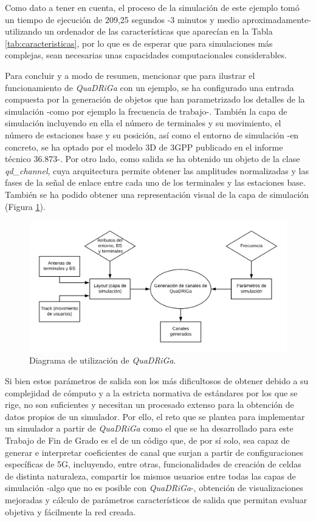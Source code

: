 Como dato a tener en cuenta, el proceso de la simulación de este ejemplo tomó un tiempo de ejecución de 209,25 segundos -3 minutos y medio aproximadamente- utilizando un ordenador de las características que aparecían en la Tabla \ref{tab:caracteristicas}, por lo que es de esperar que para simulaciones más complejas, sean necesarias unas capacidades computacionales considerables.

Para concluir y a modo de resumen, mencionar que para ilustrar el funcionamiento de \textit{QuaDRiGa} con un ejemplo, se ha configurado una entrada compuesta por la generación de objetos que han parametrizado los detalles de la simulación -como por ejemplo la frecuencia de trabajo-. También la capa de simulación incluyendo en ella el número de terminales y su movimiento, el número de estaciones base y su posición, así como el entorno de simulación -en concreto, se ha optado por el modelo 3D de 3GPP publicado en el informe técnico 36.873-. Por otro lado, como salida se ha obtenido un objeto de la clase \textit{qd\_channel}, cuya arquitectura permite obtener las amplitudes normalizadas y las fases de la señal de enlace entre cada uno de los terminales y las estaciones base. También se ha podido obtener una representación visual de la capa de simulación (Figura \ref{fig:esquema_ejemplo}).

\begin{figure}[ht!]
	\centering
    \includegraphics[width=\linewidth]{imagenes/diagrama_ejemplo.png}
	\caption{Diagrama de utilización de \textit{QuaDRiGa}.}
	\label{fig:esquema_ejemplo}
\end{figure}

Si bien estos parámetros de salida son los más dificultosos de obtener debido a su complejidad de cómputo y a la estricta normativa de estándares por los que se rige, no son suficientes y necesitan un procesado extenso para la obtención de datos propios de un simulador. Por ello, el reto que se plantea para implementar un simulador a partir de \textit{QuaDRiGa} como el que se ha desarrollado para este Trabajo de Fin de Grado es el de un código que, de por sí solo, sea capaz de generar e interpretar coeficientes de canal que surjan a partir de configuraciones específicas de 5G, incluyendo, entre otras, funcionalidades de creación de celdas de distinta naturaleza, compartir los mismos usuarios entre todas las capas de simulación -algo que no es posible con \textit{QuaDRiGa}-, obtención de visualizaciones mejoradas y cálculo de parámetros característicos de salida que permitan evaluar objetiva y fácilmente la red creada.

